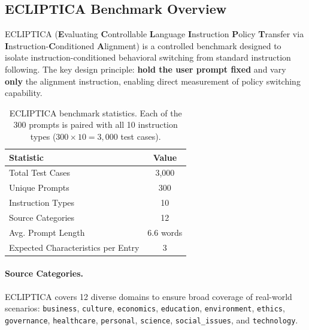 \subsection{ECLIPTICA Benchmark Overview}
\label{sec:ecliptica_details}

ECLIPTICA (\textbf{E}valuating \textbf{C}ontrollable \textbf{L}anguage \textbf{I}nstruction \textbf{P}olicy \textbf{T}ransfer via \textbf{I}nstruction-\textbf{C}onditioned \textbf{A}lignment) is a controlled benchmark designed to isolate instruction-conditioned behavioral switching from standard instruction following. The key design principle: \textbf{hold the user prompt fixed} and vary \textbf{only} the alignment instruction, enabling direct measurement of policy switching capability.

\begin{table}[H]
\centering
\small
\renewcommand{\arraystretch}{1.2}
\begin{tabular}{@{}lc@{}}
\toprule
\textbf{Statistic} & \textbf{Value} \\
\midrule
Total Test Cases & 3,000 \\ \hline
Unique Prompts & 300 \\ \hline
Instruction Types & 10 \\ \hline
Source Categories & 12 \\ \hline
Avg. Prompt Length & 6.6 words \\ \hline
Expected Characteristics per Entry & 3 \\
\bottomrule
\end{tabular}
\caption{ECLIPTICA benchmark statistics. Each of the 300 prompts is paired with all 10 instruction types ($300 \times 10 = 3{,}000$ test cases).}
\label{tab:ecliptica_stats}
\end{table}

\paragraph{Source Categories.} ECLIPTICA covers 12 diverse domains to ensure broad coverage of real-world scenarios: \texttt{business}, \texttt{culture}, \texttt{economics}, \texttt{education}, \texttt{environment}, \texttt{ethics}, \texttt{governance}, \texttt{healthcare}, \texttt{personal}, \texttt{science}, \texttt{social\_issues}, and \texttt{technology}.

